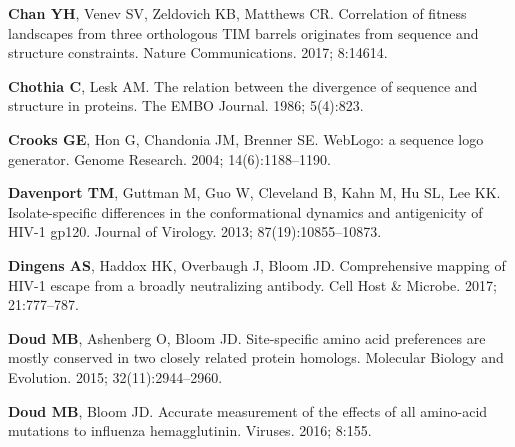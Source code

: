 \documentclass[9pt]{elife}
\begin{document}
\begin{thebibliography}{114}
\textbf{\color{eLifeMediumGrey} Chan YH}, Venev SV, Zeldovich KB, Matthews CR.
\newblock Correlation of fitness landscapes from three orthologous TIM barrels
  originates from sequence and structure constraints.
\newblock Nature Communications.  2017; 8:14614.

\textbf{\color{eLifeMediumGrey} Chothia C}, Lesk AM.
\newblock The relation between the divergence of sequence and structure in
  proteins.
\newblock The EMBO Journal.  1986; 5(4):823.

\textbf{\color{eLifeMediumGrey} Crooks GE}, Hon G, Chandonia JM, Brenner SE.
\newblock WebLogo: a sequence logo generator.
\newblock Genome Research.  2004; 14(6):1188--1190.

\textbf{\color{eLifeMediumGrey} Davenport TM}, Guttman M, Guo W, Cleveland B,
  Kahn M, Hu SL, Lee KK.
\newblock Isolate-specific differences in the conformational dynamics and
  antigenicity of HIV-1 gp120.
\newblock Journal of Virology.  2013; 87(19):10855--10873.

\textbf{\color{eLifeMediumGrey} Dingens AS}, Haddox HK, Overbaugh J, Bloom JD.
\newblock Comprehensive mapping of HIV-1 escape from a broadly neutralizing
  antibody.
\newblock Cell Host \& Microbe.  2017; 21:777--787.

\textbf{\color{eLifeMediumGrey} Doud MB}, Ashenberg O, Bloom JD.
\newblock Site-specific amino acid preferences are mostly conserved in two
  closely related protein homologs.
\newblock Molecular Biology and Evolution.  2015; 32(11):2944--2960.

\textbf{\color{eLifeMediumGrey} Doud MB}, Bloom JD.
\newblock Accurate measurement of the effects of all amino-acid mutations to
  influenza hemagglutinin.
\newblock Viruses.  2016; 8:155.


\end{thebibliography}
\end{document}
